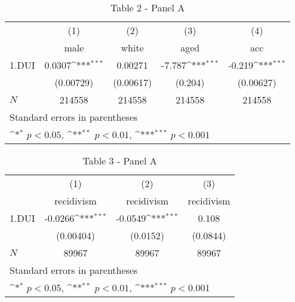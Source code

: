 \documentclass{book}
\begin{document}
\begin{table}[htbp]\centering
\def\sym#1{\ifmmode^{#1}\else\(^{#1}\)\fi}
\caption{Table 2 - Panel A}
\begin{tabular}{l*{4}{c}}
\hline\hline
            &\multicolumn{1}{c}{(1)}&\multicolumn{1}{c}{(2)}&\multicolumn{1}{c}{(3)}&\multicolumn{1}{c}{(4)}\\
            &\multicolumn{1}{c}{male}&\multicolumn{1}{c}{white}&\multicolumn{1}{c}{aged}&\multicolumn{1}{c}{acc}\\
\hline
1.DUI       &      0.0307\sym{***}&     0.00271         &      -7.787\sym{***}&      -0.219\sym{***}\\
            &   (0.00729)         &   (0.00617)         &     (0.204)         &   (0.00627)         \\
\hline
\(N\)       &      214558         &      214558         &      214558         &      214558         \\
\hline\hline
\multicolumn{5}{l}{\footnotesize Standard errors in parentheses}\\
\multicolumn{5}{l}{\footnotesize \sym{*} \(p<0.05\), \sym{**} \(p<0.01\), \sym{***} \(p<0.001\)}\\
\end{tabular}
\end{table}


\begin{table}[htbp]\centering
\def\sym#1{\ifmmode^{#1}\else\(^{#1}\)\fi}
\caption{Table 3 - Panel A}
\begin{tabular}{l*{3}{c}}
\hline\hline
            &\multicolumn{1}{c}{(1)}&\multicolumn{1}{c}{(2)}&\multicolumn{1}{c}{(3)}\\
            &\multicolumn{1}{c}{recidivism}&\multicolumn{1}{c}{recidivism}&\multicolumn{1}{c}{recidivism}\\
\hline
1.DUI       &     -0.0266\sym{***}&     -0.0549\sym{***}&       0.108         \\
            &   (0.00404)         &    (0.0152)         &    (0.0844)         \\
\hline
\(N\)       &       89967         &       89967         &       89967         \\
\hline\hline
\multicolumn{4}{l}{\footnotesize Standard errors in parentheses}\\
\multicolumn{4}{l}{\footnotesize \sym{*} \(p<0.05\), \sym{**} \(p<0.01\), \sym{***} \(p<0.001\)}\\
\end{tabular}
\end{table}
\end{document}
